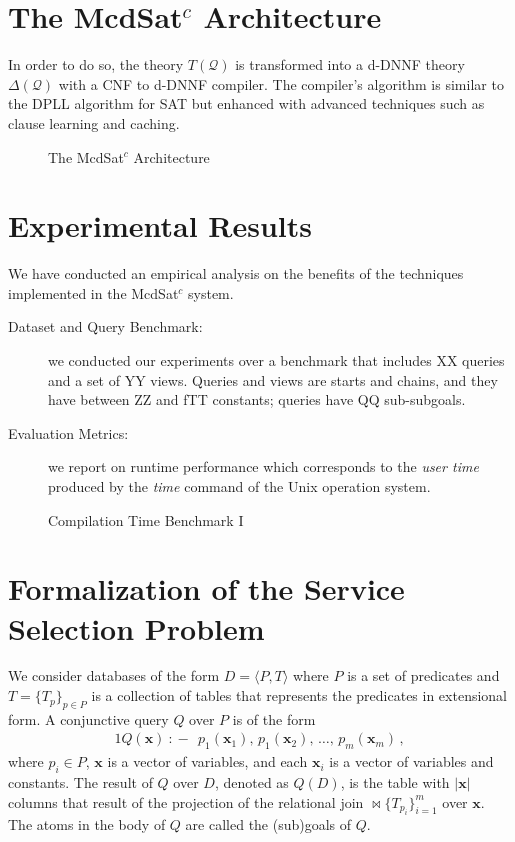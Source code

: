 \documentclass{llncs}
\newcommand{\tup}[1]{\langle #1 \rangle}
\newcommand{\vvec}[1]{\mathbf{#1}}
\newcommand{\join}{\bowtie}
\newcommand{\Q}{\mathcal{Q}}
\newcommand{\qrule}{:\!\!-}
\newcommand{\Theory}[1]{T(#1)}
\begin{document}
\begin{description}
\end{description}

\section{The McdSat$^c$ Architecture}

In order to do so, the theory $\Theory{\Q}$ is transformed into a d-DNNF
theory $\Delta(\Q)$ with a CNF to d-DNNF compiler.
The compiler's algorithm is similar to the DPLL algorithm
for SAT but enhanced with advanced techniques such as clause
learning and caching.
\begin{figure}
\centering
\caption{The McdSat$^c$ Architecture}
\label{fig:dnnf}
\end{figure}



\section{Experimental Results}
We have conducted an empirical analysis  on the benefits of the techniques implemented in the   McdSat$^c$ system.

\begin{description}
\item[Dataset and Query Benchmark:]  we conducted our experiments over a benchmark that includes XX queries and a set of  YY views. Queries and views are starts and chains, and they have between ZZ and fTT constants; queries have QQ sub-subgoals.
\item[Evaluation Metrics:] we report on runtime performance which corresponds to the  {\it user time} produced by the {\it time} command of the Unix operation system. 
\end{description}
 
\begin{figure}
\centering
\caption{Compilation Time Benchmark I}
\label{fig:plot1}
\end{figure}


\section{Formalization of the Service Selection Problem}

We consider databases of the form $D=\tup{P,T}$ where
$P$ is a set of predicates and $T=\{T_p\}_{p\in P}$ is a collection
of tables that represents the predicates in extensional form.
A conjunctive query $Q$ over $P$ is of the form 
\begin{alignat*}{1}
Q(\vvec{x})\ \qrule\ \  p_1(\vvec{x}_1),\, p_1(\vvec{x}_2),\, \ldots,\, p_m(\vvec{x}_m)\,,
\end{alignat*}
where $p_i\in P$, $\vvec{x}$ is a vector of variables, and each
$\vvec{x}_i$ is a vector of variables and constants.
The result of $Q$ over $D$, denoted as $Q(D)$, is the table with
$|\vvec{x}|$ columns that result of the projection of the relational
join $\join\!\!\{T_{p_i}\}_{i=1}^m$ over $\vvec{x}$.
The atoms in the body of $Q$ are called the (sub)goals of $Q$.
\end{document}
